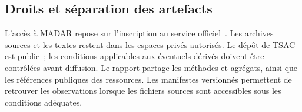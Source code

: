 \subsection{Droits et séparation des artefacts}
L’accès à MADAR repose sur l’inscription au service officiel~\cite{madar-access}. Les archives sources et les textes restent dans les espaces privés autorisés. Le dépôt de TSAC est public~\cite{tsac-repo}; les conditions applicables aux éventuels dérivés doivent être contrôlées avant diffusion. Le rapport partage les méthodes et agrégats, ainsi que les références publiques des ressources. Les manifestes versionnés permettent de retrouver les observations lorsque les fichiers sources sont accessibles sous les conditions adéquates.
\FloatBarrier

